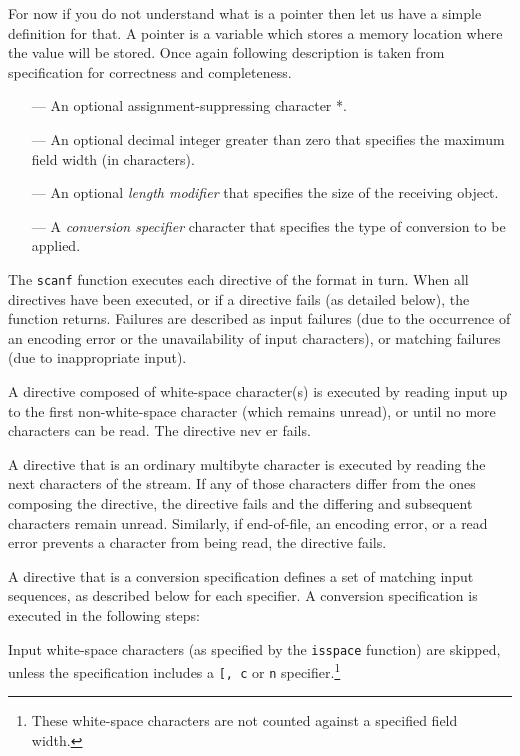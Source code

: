 For now if you do not understand what is a pointer then let us have a simple
definition for that. A pointer is a variable which stores a memory location
where the value will be stored. Once again following description is taken from
specification for correctness and completeness.

\begin{itemize}
\item[---] An optional assignment-suppressing character *.
\item[---] An optional decimal integer greater than zero that specifies the
  maximum field width (in characters).
\item[---] An optional \textit{length modifier} that specifies the size of the
  receiving object. 
\item[---] A \textit{conversion specifier} character that specifies the type of
  conversion to be applied.
\end{itemize}

The \texttt{scanf} function executes each directive of the format in turn. When
all directives have been executed, or if a directive fails (as detailed below),
the function returns. Failures are described as input failures (due to the
occurrence of an encoding error or the unavailability of input characters), or
matching failures (due to inappropriate input).

A directive composed of white-space character(s) is executed by reading input
up to the first non-white-space character (which remains unread), or until no
more characters can be read. The directive nev er fails.

A directive that is an ordinary multibyte character is executed by reading the
next characters of the stream. If any of those characters differ from the ones
composing the directive, the directive fails and the differing and subsequent
characters remain unread. Similarly, if end-of-file, an encoding error, or a
read error prevents a character from being read, the directive fails.

A directive that is a conversion specification defines a set of matching input
sequences, as described below for each specifier. A conversion specification is
executed in the following steps:

Input white-space characters (as specified by the \texttt{isspace} function)
are skipped, unless the specification includes a \texttt{[, c} or \texttt{n}
specifier.\footnote{These white-space characters are not counted against a
  specified field width.}

